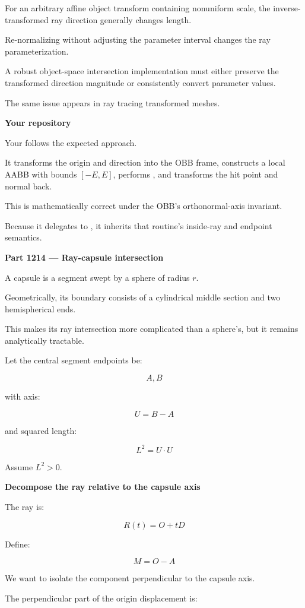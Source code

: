 For an arbitrary affine object transform containing nonuniform scale, the inverse-transformed ray direction generally changes length.

Re-normalizing without adjusting the parameter interval changes the ray parameterization.

A robust object-space intersection implementation must either preserve the transformed direction magnitude or consistently convert parameter values.

The same issue appears in ray tracing transformed meshes.

\textbf{Your repository}

Your  follows the expected approach.

It transforms the origin and direction into the OBB frame, constructs a local AABB with bounds \([-E,E]\), performs , and transforms the hit point and normal back.

This is mathematically correct under the OBB's orthonormal-axis invariant.

Because it delegates to , it inherits that routine's inside-ray and endpoint semantics.

\textbf{Part 1214 --- Ray-capsule intersection}

A capsule is a segment swept by a sphere of radius \(r\).

Geometrically, its boundary consists of a cylindrical middle section and two hemispherical ends.

This makes its ray intersection more complicated than a sphere's, but it remains analytically tractable.

Let the central segment endpoints be:

\[
A,B
\]

with axis:

\[
U=B-A
\]

and squared length:

\[
L^2=U\cdot U
\]

Assume \(L^2>0\).

\textbf{Decompose the ray relative to the capsule axis}

The ray is:

\[
R(t)=O+tD
\]

Define:

\[
M=O-A
\]

We want to isolate the component perpendicular to the capsule axis.

The perpendicular part of the origin displacement is:

